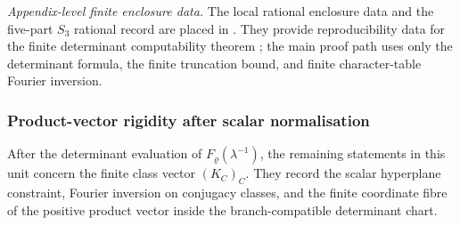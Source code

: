\documentclass[11pt,a4paper]{amsart}
\theoremstyle{plain}
\theoremstyle{definition}
\theoremstyle{remark}
\begin{document}
\medskip
\noindent\textit{Appendix-level finite enclosure data.}
  The local rational enclosure data and the five-part \(S_3\) rational
  record are placed in
  .
  They provide reproducibility data for the finite determinant computability
  theorem ; the main proof path
  uses only the determinant formula, the finite truncation bound, and finite
  character-table Fourier inversion.


\subsubsection{Product-vector rigidity after scalar normalisation}
\label{subsubsec:class-product-vector-rigidity}

After the determinant evaluation of \(F_\varrho(\lambda^{-1})\), the remaining
statements in this unit concern the finite class vector \((K_C)_C\).  They
record the scalar hyperplane constraint, Fourier inversion on conjugacy
classes, and the finite coordinate fibre of the positive product vector inside
the branch-compatible determinant chart.
\end{document}

